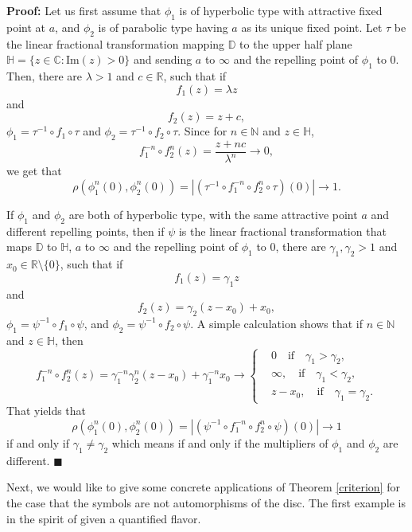 \documentclass[12pt,a4paper]{amsart}
\theoremstyle{plain}
\theoremstyle{definition}
\theoremstyle{remark}
\theoremstyle{fact}
\newenvironment{pf}
{\noindent\textbf{Proof:}}
{\hfill $\blacksquare$\par\medskip}
\begin{document}
\begin{pf}
        Let us first assume that $\phi_1$ is of hyperbolic type with attractive fixed point at $a$, and $\phi_2$ is of parabolic type having $a$ as its unique fixed point. Let $\tau$ be the linear fractional transformation mapping $\mathbb{D}$ to the upper half plane $\mathbb{H}=\{z\in \mathbb{C}: \text{Im}(z)>0\}$ and sending $a$ to $\infty$ and the repelling point of $\phi_1$ to $0$. Then, there are $\lambda >1$ and $c\in \mathbb{R}$, such that if
        $$
        f_1(z)=\lambda z
        $$
        and 
        $$
        f_2(z)=z+c,
        $$
        $\phi_1=\tau^{-1}\circ f_1\circ \tau$ and $\phi_2=\tau^{-1}\circ f_2\circ \tau$. Since for $n\in \mathbb{N}$ and $z\in \mathbb{H}$,
        $$
        f_1^{-n}\circ f_2^n(z)=\frac{z+nc}{\lambda ^n}\rightarrow 0,
        $$
        we get that 
        $$
        \rho(\phi_1^n(0),\phi_2^n(0))=|(\tau^{-1}\circ f_1^{-n}\circ f_2^n \circ \tau)(0)|\rightarrow 1.
        $$

        If $\phi_1$ and $\phi_2$ are both of hyperbolic type, with the same attractive point $a$ and different repelling points, then if $\psi$ is the linear fractional transformation that maps $\mathbb{D}$ to $\mathbb{H}$, $a$ to $\infty$ and the repelling point of $\phi_1$ to $0$, there are $\gamma_1, \gamma_2>1$ and $x_0\in \mathbb{R}\setminus \{0\}$, such that if
        $$
        f_1(z)=\gamma_1 z
        $$
        and 
        $$
        f_2(z)=\gamma_2(z-x_0)+x_0,
        $$
        $\phi_1=\psi^{-1}\circ f_1\circ \psi$, and $\phi_2=\psi^{-1}\circ f_2\circ \psi$. A simple calculation shows that if $n\in \mathbb{N}$ and $z\in \mathbb{H}$, then
        $$
        f_1^{-n}\circ f_2^n(z)=\gamma_1^{-n}\gamma_2^n(z-x_0)+\gamma_1^{-n}x_0\rightarrow 
        \begin{cases}
            &0 \quad \text{if} \quad \gamma_1>\gamma_2,\\
            &\infty, \quad \text{if} \quad \gamma_1<\gamma_2,\\
            &z-x_0, \quad \text{if} \quad \gamma_1=\gamma_2.
        \end{cases}
        $$
        That yields that 
        $$
        \rho(\phi_1^n(0),\phi_2^n(0))=|(\psi^{-1}\circ f_1^{-n}\circ f_2^n \circ \psi)(0)|\rightarrow 1
        $$
        if and only if $\gamma_1 \neq \gamma_2$ which means if and only if the multipliers of $\phi_1$ and $\phi_2$ are different.
    \end{pf}

    Next, we would like to give some concrete applications of Theorem \ref{criterion} for the case that the symbols are not automorphisms of the disc. The first example is in the spirit of \cite[Example 4.6]{BGGM09} given a quantified flavor. 
\end{document}
